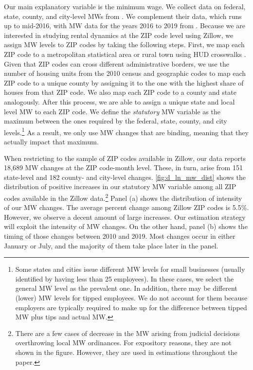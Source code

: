 Our main explanatory variable is the minimum wage. We collect data on federal, state, 
county, and city-level MWs from \textcite{VaghulZipperer2016}. We complement their data,
which runs up to mid-2016, with MW data for the years 2016 to 2019 from 
\textcite{BerkeleyLaborCenter}. Because we are interested in studying rental dynamics at 
the ZIP code level using Zillow, we assign MW levels to ZIP codes by taking the following steps.
First, we map each ZIP code to a metropolitan statistical area or rural town using HUD 
crosswalks \parencite{hudCrosswalks}. Given that ZIP codes can cross different administrative
borders, we use the number of housing units from the 2010 census and geographic codes to map 
each ZIP code to a unique county by assigning it to the one with the highest share of houses 
from that ZIP code. We also map each ZIP code to a county and state analogously. After this 
process, we are able to assign a unique state and local level MW to each ZIP code. We define 
the \textit{statutory} MW variable as the maximum between the ones required by the federal, 
state, county, and city levels.\footnote{Some states and cities issue different MW levels 
	for small businesses (usually identified by having less than 25 employees). In these 
	cases, we select the general MW level as the prevalent one. In addition, there may be 
	different (lower) MW levels for tipped employees. We do not account for them because 
	employers are typically required to make up for the difference between tipped MW plus 
	tips and actual MW.}
As a result, we only use MW changes that are binding, meaning that they actually impact 
that maximum.

When restricting to the sample of ZIP codes available in Zillow, our data reports 18,689 
MW changes at the ZIP code-month level. These, in turn, arise from 151 state-level and 182 
county- and city-level changes. \autoref{fig:d_ln_mw_dist} shows the distribution of 
positive increases in our statutory MW variable among all ZIP codes available in the 
Zillow data.\footnote{There are a few cases of decrease in the MW arising from judicial 
	decisions overthrowing local MW ordinances. For expository reasons, they are not shown 
	in the figure. However, they are used in estimations throughout the paper.}
Panel (a) shows the distribution of intensity of our MW changes. The average percent 
change among Zillow ZIP codes is 5.5\%. %
However, we observe a decent amount of large increases. Our estimation strategy will
exploit the intensity of MW changes. On the other hand, panel (b) shows the timing of 
those changes between 2010 and 2019. Most changes occur in either January or July, 
and the majority of them take place later in the panel.

